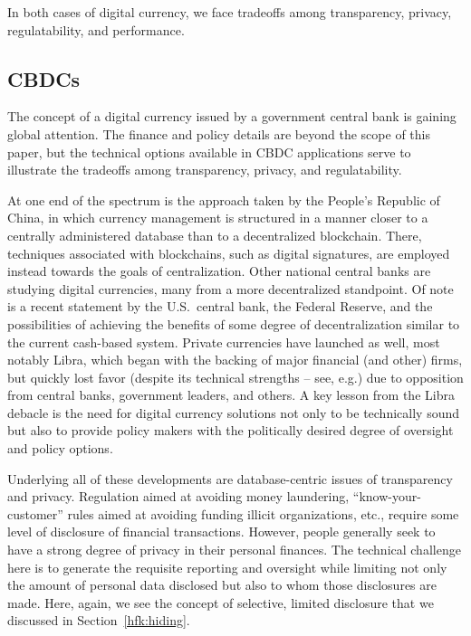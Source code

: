 \documentclass[11pt,dvipdfm]{article}
\begin{document}
In both cases of digital currency, we face  tradeoffs among transparency, privacy, regulatability, and
performance.

\subsection{CBDCs}

The concept of a digital currency issued by a government central bank is gaining global attention\cite{Will21}.
The finance and policy details are beyond the scope of this paper, but the technical options available
in  CBDC applications serve to illustrate the tradeoffs among transparency, privacy, and regulatability.

At one end of the spectrum is the approach taken by the People's Republic of China\cite{Fanusie21}, in
which currency management is structured in a manner closer to a centrally administered database than to
a decentralized blockchain.
There, techniques associated with blockchains, such as digital signatures, are employed instead towards the
goals of centralization.
Other national central banks are studying digital currencies, many from a more decentralized standpoint.
Of note is a recent statement by the U.S.\ central bank, the Federal Reserve\cite{fed}, and the possibilities of achieving the
benefits of some degree of decentralization similar to the current cash-based system\cite{Knox}.
Private currencies have launched as well, most notably Libra, which began with 
the backing of major financial (and other) firms, but quickly lost favor (despite its technical
strengths -- see, e.g.\cite{hotstuff}) due to opposition from central banks,
government leaders, and others.
A key lesson from the Libra debacle is the need for digital currency solutions not only to
be technically sound but also to provide policy makers with the politically desired degree of 
oversight and policy options.

Underlying all of these developments are database-centric issues of transparency and privacy.
Regulation aimed at avoiding money laundering, ``know-your-customer'' rules aimed at avoiding funding
illicit organizations, etc., require some level of disclosure of financial transactions.
However, people generally seek to have a strong degree of privacy in their personal finances.
The technical challenge here is to generate the requisite reporting and oversight while limiting not only
the amount of personal data disclosed but also to whom those disclosures are made.
Here, again, we see the concept of selective, limited disclosure that we discussed in Section~\ref{hfk:hiding}.
\end{document}
